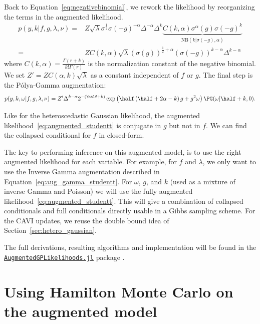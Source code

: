 Back to Equation~\eqref{eq:negativebinomial}, we rework the likelihood by reorganizing the terms in the augmented likelihood.
\begin{align*}
    p(y,k|f,g,\lambda,\nu) =& Z\sqrt{\lambda}\sigma^{\frac{1}{2}}\sigma(-g)^{-\alpha}\Delta^{-\alpha}\Delta^k\underbrace{C(k,\alpha)\sigma^{\alpha}(g)\sigma(-g)^k}_{\mathrm{NB}(k|\sigma(-g),\alpha)}\\
    =& ZC(k,\alpha)\sqrt{\lambda}(\sigma(g))^{\frac{1}{2}+\alpha}(\sigma(-g))^{k-\alpha}\Delta^{k-\alpha}
\end{align*}
where $C(k, \alpha) = \frac{\Gamma(r + k)}{k!\Gamma(r)}$ is the normalization constant of the negative binomial.
We set $Z'=ZC(\alpha,k)\sqrt{\lambda}$ as a constant independent of $f$ or $g$.
The final step is the P\'olya-Gamma augmentation:
\begin{align}
    p(y,k,\omega|f,g,\lambda,\nu) = Z'\Delta^{k-\alpha}2^{-(\half+k)}\exp\left(\half\left(\half + 2\alpha - k\right)g + g^2\omega\right)\PG(\omega|\half+k,0)\label{eq:augmented_studentt}.
\end{align}

Like for the heteroscedastic Gaussian likelihood, the augmented likelihood~\eqref{eq:augmented_studentt} is conjugate in $g$ but not in $f$.
We can find the collapsed conditional for $f$ in closed-form.

The key to performing inference on this augmented model, is to use the right augmented likelihood for each variable.
For example, for $f$ and $\lambda$, we only want to use the Inverse Gamma augmentation described in Equation~\eqref{eq:aug_gamma_studentt}.
For $\omega$, $g$, and $k$ (used as a mixture of inverse Gamma and Poisson) we will use the fully augmented likelihood~\eqref{eq:augmented_studentt}.
This will give a combination of collapsed conditionals and full conditionals directly usable in a Gibbs sampling scheme.
For the \ac{CAVI} updates, we reuse the double bound idea of Section~\ref{sec:hetero_gaussian}.

The full derivations, resulting algorithms and implementation will be found in the \href{https://github.com/JuliaGaussianProcesses/AugmentedGPLikelihoods.jl}{\texttt{AugmentedGPLikelihoods.jl}} package \cite{theo_galy_fajou_2022_6347022}.

\section{Using Hamilton Monte Carlo on the augmented model}

